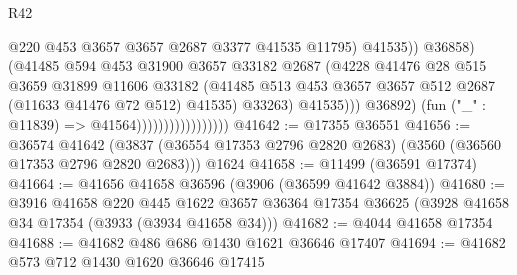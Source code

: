 \begin{lexlean}{R42}
\begin{coremodule}
                                                  @220
                                                  @453
                                                  @3657
                                                  @3657
                                                  @2687
                                                  @3377
                                                  @41535
                                                  @11795)
                                                @41535))
                                            @36858)
                                          (@41485
                                            @594
                                            @453
                                            @31900
                                            @3657
                                            @33182
                                            @2687
                                            (@4228
                                              @41476
                                              @28
                                              @515
                                              @3659
                                              @31899
                                              @11606
                                              @33182
                                              (@41485
                                                @513
                                                @453
                                                @3657
                                                @3657
                                                @512
                                                @2687
                                                (@11633 @41476 @72 @512)
                                                @41535)
                                              @33263)
                                            @41535)))
                                      @36892)
                                    (fun ("_" : @11839) => @41564)))))))))))))))))
@41642 := @17355 @36551
@41656 := @36574
    @41642
    (@3837 (@36554 @17353 @2796 @2820 @2683) (@3560 (@36560 @17353 @2796 @2820 @2683)))
    @1624
@41658 := @11499 (@36591 @17374)
@41664 := @41656 @41658 @36596 (@3906 (@36599 @41642 @3884))
@41680 := @3916
    @41658
    @220
    @445
    @1622
    @3657
    @36364
    @17354
    @36625
    (@3928 @41658 @34 @17354 (@3933 (@3934 @41658 @34)))
@41682 := @4044 @41658 @17354
@41688 := @41682 @486 @686 @1430 @1621 @36646 @17407
@41694 := @41682 @573 @712 @1430 @1620 @36646 @17415

\end{coremodule}
\end{lexlean}
